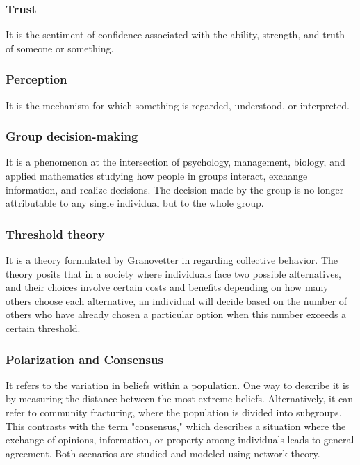 \subsubsection{Trust} It is the sentiment of confidence associated with the ability, strength, and truth of someone or something. 

\subsubsection{Perception} It is the mechanism for which something is regarded, understood, or interpreted.

\subsubsection{Group decision-making} It is a phenomenon at the intersection of psychology, management, biology, and applied mathematics studying how people in groups interact, exchange information, and realize decisions. The decision made by the group is no longer attributable to any single individual but to the whole group. 
 
\subsubsection{Threshold theory}

It is a theory formulated by Granovetter in \cite{Granovetter_1978} regarding collective behavior. The theory posits that in a society where individuals face two possible alternatives, and their choices involve certain costs and benefits depending on how many others choose each alternative, an individual will decide based on the number of others who have already chosen a particular option when this number exceeds a certain threshold.

\subsubsection{Polarization and Consensus}

It refers to the variation in beliefs within a population. One way to describe it is by measuring the distance between the most extreme beliefs. Alternatively, it can refer to community fracturing, where the population is divided into subgroups\cite{Bramson_2017}. This contrasts with the term "consensus," which describes a situation where the exchange of opinions, information, or property among individuals leads to general agreement. Both scenarios are studied and modeled using network theory.

